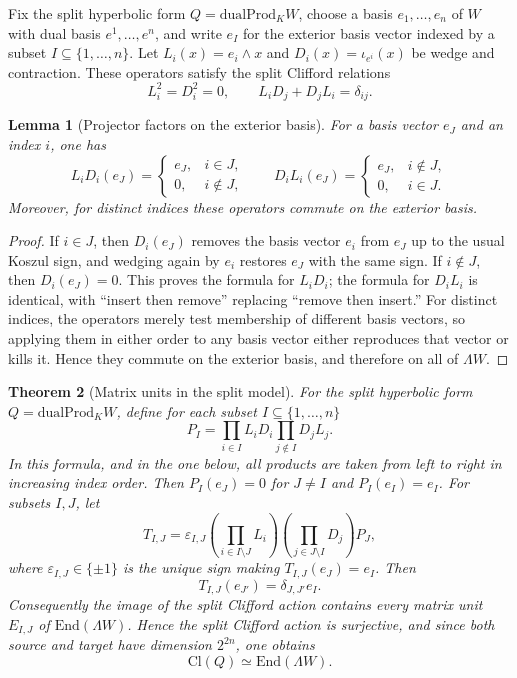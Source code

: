 \documentclass{birkjour}
\theoremstyle{plain}
\newtheorem{theorem}{Theorem}[section]
\newtheorem{lemma}[theorem]{Lemma}
\theoremstyle{definition}
\theoremstyle{remark}
\newcommand{\Cl}{\mathrm{Cl}}
\newcommand{\End}{\mathrm{End}}
\newcommand{\dualProd}{\mathrm{dualProd}}
\newcommand{\wedgeW}{\Lambda W}
\begin{document}
Fix the split hyperbolic form $Q=\dualProd_K W$, choose a basis
$e_1,\dots,e_n$ of $W$ with dual basis $e^1,\dots,e^n$, and write
$e_I$ for the exterior basis vector indexed by a subset
$I\subseteq \{1,\dots,n\}$. Let $L_i(x)=e_i\wedge x$ and
$D_i(x)=\iota_{e^i}(x)$ be wedge and contraction. These operators satisfy the
split Clifford relations
\[
  L_i^2=D_i^2=0,
  \qquad
  L_iD_j+D_jL_i=\delta_{ij}.
\]

\begin{lemma}[Projector factors on the exterior basis]
For a basis vector $e_J$ and an index $i$, one has
\[
  L_iD_i(e_J)=
  \begin{cases}
    e_J,& i\in J,\\
    0,& i\notin J,
  \end{cases}
  \qquad
  D_iL_i(e_J)=
  \begin{cases}
    e_J,& i\notin J,\\
    0,& i\in J.
  \end{cases}
\]
Moreover, for distinct indices these operators commute on the exterior basis.
\end{lemma}

\begin{proof}
If $i\in J$, then $D_i(e_J)$ removes the basis vector $e_i$ from $e_J$ up to
the usual Koszul sign, and wedging again by $e_i$ restores $e_J$ with the same
sign. If $i\notin J$, then $D_i(e_J)=0$. This proves the formula for $L_iD_i$;
the formula for $D_iL_i$ is identical, with ``insert then remove'' replacing
``remove then insert.'' For distinct indices, the operators merely test
membership of different basis vectors, so applying them in either order to any
basis vector either reproduces that vector or kills it. Hence they commute on
the exterior basis, and therefore on all of $\wedgeW$.
\end{proof}

\begin{theorem}[Matrix units in the split model]
\label{thm:matrix-units-split}
For the split hyperbolic form $Q=\dualProd_K W$, define for each subset
$I\subseteq \{1,\dots,n\}$
\[
  P_I=\prod_{i\in I} L_iD_i \prod_{j\notin I} D_jL_j .
\]
In this formula, and in the one below, all products are taken from left to
right in increasing index order. Then $P_I(e_J)=0$ for $J\neq I$ and
$P_I(e_I)=e_I$. For subsets $I,J$, let
\[
  T_{I,J}=
    \varepsilon_{I,J}
    (\prod_{i\in I\setminus J} L_i)
    (\prod_{j\in J\setminus I} D_j)
    P_J,
\]
where $\varepsilon_{I,J}\in\{\pm 1\}$ is the unique sign making
$T_{I,J}(e_J)=e_I$. Then
\[
  T_{I,J}(e_{J'})=\delta_{J,J'} e_I.
\]
Consequently the image of the split Clifford action contains every matrix unit
$E_{I,J}$ of $\End(\wedgeW)$. Hence the split Clifford action is
surjective, and since both source and target have dimension $2^{2n}$, one obtains
\[
  \Cl(Q)\simeq \End(\wedgeW).
\]
\end{theorem}
\end{document}
